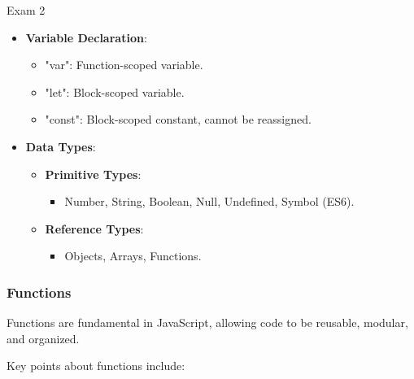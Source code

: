 \begin{examnotes}{Exam 2}
\begin{highlight}
        \begin{itemize}
            \item \textbf{Variable Declaration}:
                \begin{itemize}
                    \item "var": Function-scoped variable.
                    \item "let": Block-scoped variable.
                    \item "const": Block-scoped constant, cannot be reassigned.
                \end{itemize}
            \item \textbf{Data Types}:
                \begin{itemize}
                    \item \textbf{Primitive Types}:
                        \begin{itemize}
                            \item Number, String, Boolean, Null, Undefined, Symbol (ES6).
                        \end{itemize}
                    \item \textbf{Reference Types}:
                        \begin{itemize}
                            \item Objects, Arrays, Functions.
                        \end{itemize}
                \end{itemize}
        \end{itemize}
    \end{highlight}
    
    \subsubsection*{Functions}
    
    Functions are fundamental in JavaScript, allowing code to be reusable, modular, and organized.
    
    \begin{highlight}[Functions]
        Key points about functions include:
        

\end{highlight}
\end{examnotes}
